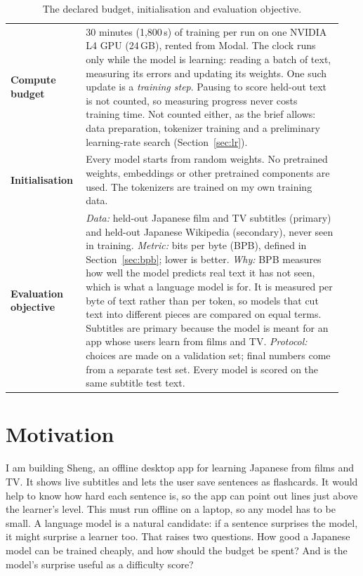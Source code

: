 \documentclass[11pt]{article}
\begin{document}
\begin{table}[H]
\centering\small
\begin{tabular}{p{0.2\linewidth}p{0.74\linewidth}}
\toprule
\textbf{Compute budget} & 30 minutes (1{,}800\,s) of training per run on one NVIDIA
L4 GPU (24\,GB), rented from Modal. The clock runs only while the model is
learning: reading a batch of text, measuring its errors and updating its
weights. One such update is a \emph{training step}. Pausing to score held-out
text is not counted, so measuring progress never costs training time. Not
counted either, as the brief allows: data preparation, tokenizer training and a
preliminary learning-rate search (Section~\ref{sec:lr}). \\
\addlinespace
\textbf{Initialisation} & Every model starts from random weights. No pretrained
weights, embeddings or other pretrained components are used. The tokenizers are
trained on my own training data. \\
\addlinespace
\textbf{Evaluation objective} & \emph{Data:} held-out Japanese film and TV
subtitles (primary) and held-out Japanese Wikipedia (secondary), never seen in
training. \emph{Metric:} bits per byte (BPB), defined in
Section~\ref{sec:bpb}; lower is better. \emph{Why:} BPB measures how well the
model predicts real text it has not seen, which is what a language model is
for. It is measured per byte of text rather than per token, so models that cut
text into different pieces are compared on equal terms. Subtitles are primary
because the model is meant for an app whose users learn from films and TV.
\emph{Protocol:} choices are made on a validation set; final numbers come from
a separate test set. Every model is scored on the same subtitle test text. \\
\bottomrule
\end{tabular}
\caption{The declared budget, initialisation and evaluation objective.}
\label{tab:setup}
\end{table}

\section{Motivation}

I am building Sheng, an offline desktop app for learning Japanese from films
and TV. It shows live subtitles and lets the user save sentences as flashcards.
It would help to know how hard each sentence is, so the app can point out lines
just above the learner's level. This must run offline on a laptop, so any model
has to be small. A language model is a natural candidate: if a sentence
surprises the model, it might surprise a learner too. That raises two
questions. How good a Japanese model can be trained cheaply, and how should the
budget be spent? And is the model's surprise useful as a difficulty score?
\end{document}
